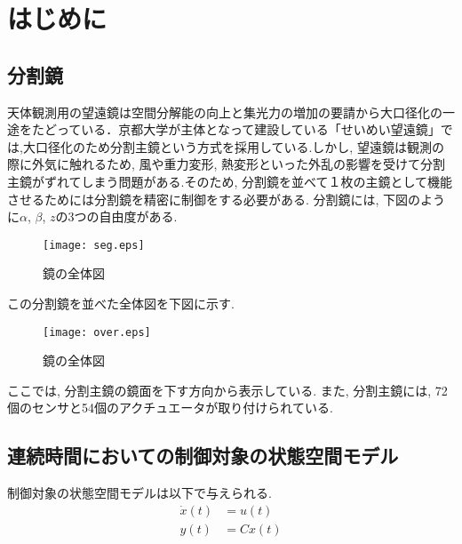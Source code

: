 \documentclass[a4paper,12pt]{jbook}
\begin{document}
\mainmatter
\newpage
\chapter{はじめに}
\section{分割鏡}

天体観測用の望遠鏡は空間分解能の向上と集光力の増加の要請から大口径化の一途をたどっている．\cite{tele_b}京都大学が主体となって建設している「せいめい望遠鏡」では,大口径化のため分割主鏡という方式を採用している.しかし, 望遠鏡は観測の際に外気に触れるため, 風や重力変形, 熱変形といった外乱の影響を受けて分割主鏡がずれてしまう問題がある.そのため, 分割鏡を並べて１枚の主鏡として機能させるためには分割鏡を精密に制御をする必要がある.
分割鏡には, 下図のように$α$, $β$, $z$の3つの自由度がある.
\begin{figure}[htbp]
 \begin{center}
  \texttt{[image: seg.eps]}
 \end{center}
 \caption{鏡の全体図}
 \label{fig:seg}
\end{figure}

\newpage
この分割鏡を並べた全体図を下図に示す.
\begin{figure}[htbp]
 \begin{center}
  \texttt{[image: over.eps]}
 \end{center}
 \caption{鏡の全体図}
 \label{fig:over}
\end{figure}

ここでは, 分割主鏡の鏡面を下す方向から表示している.
また, 分割主鏡には, 72個のセンサと54個のアクチュエータが取り付けられている.\cite{tele_a}
\section{連続時間においての制御対象の状態空間モデル} 
制御対象の状態空間モデルは以下で与えられる.
\begin{align}
\dot{x}(t) &= u(t) \label{eqn:syscon01} \\
y(t) &= C x(t) \label{eqn:syscon02}
\end{align}
\end{document}
